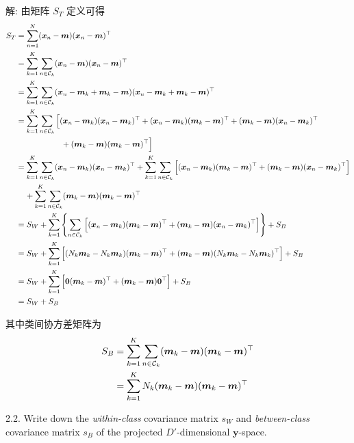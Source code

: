 \documentclass{article}
\begin{document}
解: 由矩阵 $S_T$ 定义可得
\begin{equation}
  \begin{aligned}
    S_{T}
    &=\sum_{n=1}^{N}(\bm{x}_{n}-\bm{m})(\bm{x}_{n}-\bm{m})^{\top}\\
    &=\sum_{k=1}^K\sum_{n\in\mathcal{C}_k}(\bm{x}_{n}-\bm{m})(\bm{x}_{n}-\bm{m})^{\top}\\
    &=\sum_{k=1}^K\sum_{n\in\mathcal{C}_k}(\bm{x}_{n}-\vm_k+\vm_k-\bm{m})(\bm{x}_{n}-\vm_k+\vm_k-\bm{m})^{\top}\\
    &=\sum_{k=1}^K\sum_{n\in\mathcal{C}_k}\Big[(\bm{x}_{n}-\vm_k)(\bm{x}_{n}-\vm_k)^{\top}+(\bm{x}_{n}-\vm_k)(\vm_k-\bm{m})^{\top}+(\vm_k-\bm{m})(\bm{x}_{n}-\vm_k)^{\top}\\
    &\hspace{20mm}+(\vm_k-\bm{m})(\vm_k-\bm{m})^{\top}\Big]\\
    &=\sum_{k=1}^K\sum_{n\in\mathcal{C}_k}(\bm{x}_{n}-\vm_k)(\bm{x}_{n}-\vm_k)^{\top}+\sum_{k=1}^K\sum_{n\in\mathcal{C}_k}\Big[(\bm{x}_{n}-\vm_k)(\vm_k-\bm{m})^{\top}+(\vm_k-\bm{m})(\bm{x}_{n}-\vm_k)^{\top}\Big]\\
    &\hspace{4mm}+\sum_{k=1}^K\sum_{n\in\mathcal{C}_k}(\vm_k-\bm{m})(\vm_k-\bm{m})^{\top}\\
    &=S_W+\sum_{k=1}^K\left\{\sum_{n\in\mathcal{C}_k}\Big[(\bm{x}_{n}-\vm_k)(\vm_k-\bm{m})^{\top}+(\vm_k-\bm{m})(\bm{x}_{n}-\vm_k)^{\top}\Big]\right\}+S_B\\
    &=S_W+\sum_{k=1}^K\Big[(N_k\vm_k-N_k\vm_k)(\vm_k-\bm{m})^{\top}+(\vm_k-\bm{m})(N_k\vm_k-N_k\vm_k)^{\top}\Big]+S_B\\
    &=S_W+\sum_{k=1}^K\Big[\bm{0}(\vm_k-\bm{m})^{\top}+(\vm_k-\bm{m})\bm{0}^{\top}\Big]+S_B\\
    &=S_W+S_B\\
  \end{aligned}
\end{equation}

其中类间协方差矩阵为
\begin{equation}
  \begin{aligned}
    S_{B}
    &=\sum_{k=1}^K\sum_{n\in\mathcal{C}_k}(\bm{m}_k-\bm{m})(\bm{m}_k-\bm{m})^{\top}\\
    &=\sum_{k=1}^{K}N_{k}(\bm{m}_{k}-\bm{m})(\bm{m}_{k}-\bm{m})^{\top}\\
  \end{aligned}
\end{equation}

2.2. Write down the \emph{within-class} covariance matrix $s_{W}$ and \emph{between-class} covariance matrix $s_{B}$ of the projected $D'$-dimensional $\bm{y}$-space.
\end{document}
